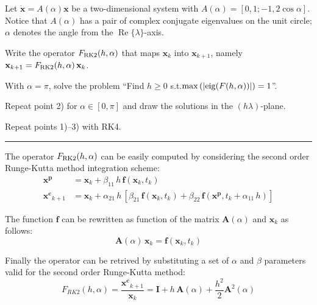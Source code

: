 \documentclass[11pt,a4paper,oneside]{article}
\renewcommand{\vec}[1]{\mathbf{#1}}
\begin{document}
Let $\dot{\vec x} = A(\alpha) \vec x$ be a two-dimensional system with $A(\alpha) = [0, 1; -1, 2\cos\alpha]$.
Notice that $A(\alpha)$ has a pair of complex conjugate eigenvalues on the unit circle; $\alpha$ denotes the angle from the $\operatorname{Re}\{\lambda\}$-axis. 
\begin{enumerate*}[label=\arabic*)]
    \item Write the operator $F_{\rm RK2}(h,\alpha)$ that maps $\vec x_k$ into $\vec x_{k+1}$, namely $\vec x_{k+1} = F_{\rm RK2}(h,\alpha) \, \vec x_k$.
    \item\!With $\alpha = \pi$, solve the problem ``Find $h\ge 0$ s.t.$\max\left(|{\rm eig}(F(h,\alpha))|\right) = 1$''.
    \item Repeat point 2) for $\alpha\in[0, \pi]$ and draw the solutions in the $(h\lambda)$-plane.
    \item Repeat points 1)--3) with RK4.
\end{enumerate*}

\medskip \hrule \medskip

The operator $F_{\rm RK2}(h,\alpha)$ can be easily computed by considering the second order Runge-Kutta method integration scheme:
\begin{subequations}
    \begin{align}
        \vec{x^p} &= \vec{x}_k + \beta_{11}\,h\, \vec{f}\left(\vec{x}_k, t_k\right) \label{eq:ex3_xp}\\
        \vec{x^c}_{k+1} &= \vec{x}_k + \alpha_{21}\, h\, \left[ \beta_{21}\, \vec{f}\left(\vec{x}_k, t_k\right) + \beta_{22}\, \vec{f}\left(\vec{x^p}, t_k+\alpha_{11}\, h\right) \right] \label{eq:ex3_xc}
    \end{align}
\end{subequations}

The function $\vec{f}$ can be rewritten as function of the matrix $\vec{A}(\alpha)$ and $\vec{x}_k$ as follows:
\begin{equation}
    \vec{A}(\alpha)\, \vec{x}_k = \vec{f}\left(\vec{x}_k, t_k\right)
    \label{eq:ex3_defineF}
\end{equation}

Finally the operator can be retrived by substituting a set of $\alpha$ and $\beta$ parameters valid for the second order Runge-Kutta method:
\begin{equation} 
    F_{RK2}(h,\alpha) = \frac{\vec{x^c}_{k+1}}{\vec{x}_k} = \vec{I} + h\, \vec{A}(\alpha) + \frac{h^2}{2} \vec{A}^2(\alpha)
    \label{eq:ex3_operatorRK2}
\end{equation}
\end{document}
